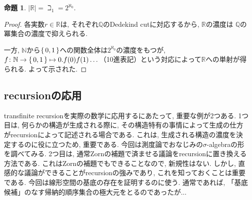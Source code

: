 \documentclass[a4paper, twoside]{bxjsarticle}
\newcommand{\nat}{\mathbb{N}}
\newcommand{\quo}{\mathbb{Q}}
\newcommand{\rea}{\mathbb{R}}
\newcommand{\abs}[1]{\left\lvert#1\right\rvert}
\theoremstyle{definition}
\newtheorem{prop}[thm]{命題}
\begin{document}
        \begin{prop}
            $\abs{\rea}=\beth_1=2^{\aleph_0}$.
        \end{prop}
        \begin{proof}
            各実数$r\in \rea$は, それぞれ$\quo$のDedekind cutに対応するから, $\rea$の濃度は $\quo$の冪集合の濃度で抑えられる.
            
            一方, $\nat$から$\set{0, 1}$への関数全体は$2^{\aleph_0}$の濃度をもつが, $f\colon\nat\to\set{0, 1} \mapsto 0.f(0)f(1)\dots$（10進表記）という対応によって$\rea$への単射が得られる. よって示された.
        \end{proof}
        
    \subsection{recursionの応用}
        transfinite recursionを実際の数学に応用するにあたって, 重要な例が2つある. 1つ目は, 何らかの構造が生成される際に, その構造特有の事情によって生成の仕方がrecursionによって記述される場合である. これは, 生成される構造の濃度を決定するのに役に立つため, 重要である. 今回は測度論でおなじみの$\sigma$-algebraの形を調べてみる. 2つ目は, 通常Zornの補題で済ませる議論をrecursionに置き換える方法である. これはZornの補題でもできることなので, 新規性はない. しかし, 直感的な議論ができることがrecursionの強みであり, これを知っておくことは重要である. 今回は線形空間の基底の存在を証明するのに使う. 通常であれば, 「基底候補」のなす帰納的順序集合の極大元をとるのであったが$\dots$
        
\end{document}
